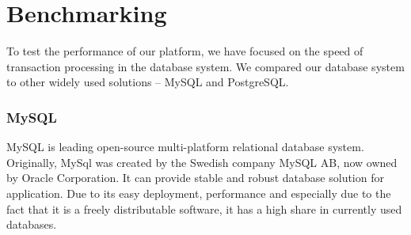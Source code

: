 



\section{Benchmarking}
\label{benchmark}
To test the performance of our platform, we have focused on the speed of transaction processing in the database system. We compared our database system to other widely used solutions -- MySQL and PostgreSQL.



\subsubsection{MySQL}
MySQL is leading open-source multi-platform relational database system. Originally, MySql was created by the Swedish company MySQL AB, now owned by Oracle Corporation. It can provide stable and robust database solution for application. Due to its easy deployment, performance and especially due to the fact that it is a freely distributable software, it has a high share in currently used databases. 
\cite{mysql2001mysql, dubois1999mysql}

